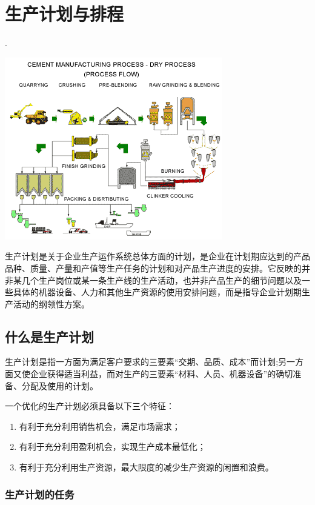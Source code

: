 \section {生产计划与排程}
.
    \begin{center}
        \includegraphics[scale=0.6]{process.png}
    \end{center}

    生产计划是关于企业生产运作系统总体方面的计划，是企业在计划期应达到的产品品种、质量、产量和产值等生产任务的计划和对产品生产进度的安排。它反映的并非某几个生产岗位或某一条生产线的生产活动，也并非产品生产的细节问题以及一些具体的机器设备、人力和其他生产资源的使用安排问题，而是指导企业计划期生产活动的纲领性方案。

\subsection {什么是生产计划}

    生产计划是指一方面为满足客户要求的三要素“交期、品质、成本”而计划;另一方面又使企业获得适当利益，而对生产的三要素“材料、人员、机器设备”的确切准备、分配及使用的计划。

    一个优化的生产计划必须具备以下三个特征：
        \begin{enumerate}
            \item  有利于充分利用销售机会，满足市场需求；
            \item  有利于充分利用盈利机会，实现生产成本最低化；
            \item  有利于充分利用生产资源，最大限度的减少生产资源的闲置和浪费。
        \end{enumerate}

    \subsubsection {生产计划的任务}

